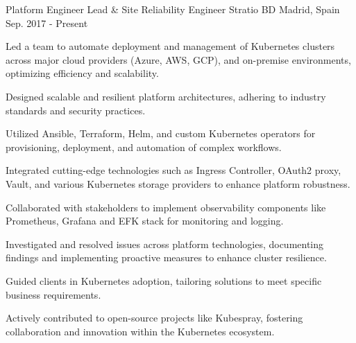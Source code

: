 

\begin{cventries}

  \cventry
    {Platform Engineer Lead \& Site Reliability Engineer} %
    {Stratio BD} %
    {Madrid, Spain} %
    {Sep. 2017 - Present} %
    {
      \begin{cvitems} %
        \item {Led a team to automate deployment and management of Kubernetes clusters across major cloud providers (Azure, AWS, GCP), and on-premise environments, optimizing efficiency and scalability.}
        \item {Designed scalable and resilient platform architectures, adhering to industry standards and security practices.}
        \item {Utilized Ansible, Terraform, Helm, and custom Kubernetes operators for provisioning, deployment, and automation of complex workflows.}
        \item {Integrated cutting-edge technologies such as Ingress Controller, OAuth2 proxy, Vault, and various Kubernetes storage providers to enhance platform robustness.}
        \item {Collaborated with stakeholders to implement observability components like Prometheus, Grafana and EFK stack for monitoring and logging.}
        \item {Investigated and resolved issues across platform technologies, documenting findings and implementing proactive measures to enhance cluster resilience.}
        \item {Guided clients in Kubernetes adoption, tailoring solutions to meet specific business requirements.}
        \item {Actively contributed to open-source projects like Kubespray, fostering collaboration and innovation within the Kubernetes ecosystem.}
      \end{cvitems}
    }


\end{cventries}
